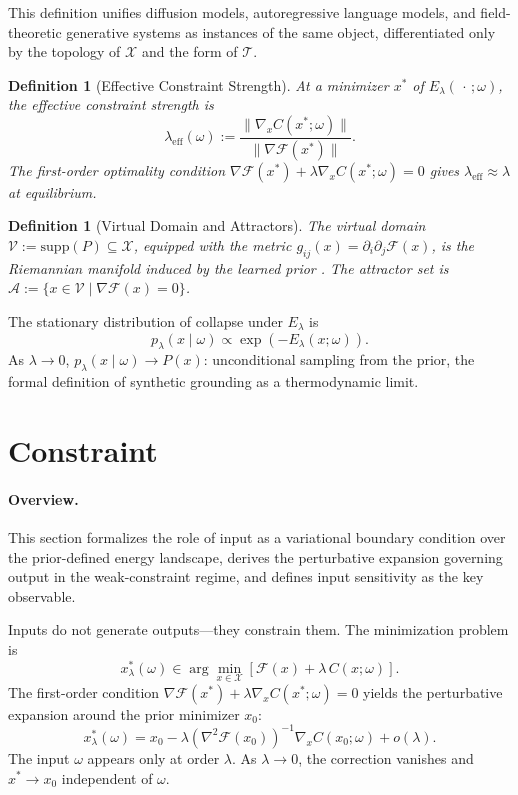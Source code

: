 \documentclass[twocolumn,10pt]{article}
\theoremstyle{thmstyle}
\theoremstyle{defstyle}
\newtheorem{definition}[theorem]{Definition}
\newcommand{\Xspace}{\mathcal{X}}
\newcommand{\Fprior}{\mathcal{F}}
\newcommand{\leff}{\lambda_{\mathrm{eff}}}
\newcommand{\Vdomain}{\mathcal{V}}
\newcommand{\Aset}{\mathcal{A}}
\begin{document}
This definition unifies diffusion models, autoregressive language
models, and field-theoretic generative systems as instances of the same
object, differentiated only by the topology of $\Xspace$ and the form
of $\mathcal{T}$.

\begin{definition}[Effective Constraint Strength]
\label{def:leff}
At a minimizer $x^*$ of $E_\lambda(\,\cdot\,;\omega)$, the
\emph{effective constraint strength} is
\[
  \leff(\omega) :=
  \frac{\|\nabla_x C(x^*;\omega)\|}{\|\nabla\Fprior(x^*)\|}.
\]
The first-order optimality condition $\nabla\Fprior(x^*) + \lambda
\nabla_x C(x^*;\omega) = 0$ gives $\leff \approx \lambda$ at equilibrium.
\end{definition}

\begin{definition}[Virtual Domain and Attractors]
\label{def:vdomain}
The \emph{virtual domain} $\Vdomain := \mathrm{supp}(P) \subseteq
\Xspace$, equipped with the metric $g_{ij}(x) =
\partial_i\partial_j\Fprior(x)$, is the Riemannian manifold induced by
the learned prior \citep{lecun2015deep}. The \emph{attractor set} is
$\Aset := \{x \in \Vdomain \mid \nabla\Fprior(x) = 0\}$.
\end{definition}

The stationary distribution of collapse under $E_\lambda$ is
\begin{equation}
  p_\lambda(x\mid\omega) \propto \exp(-E_\lambda(x;\omega)).
  \label{eq:stationary}
\end{equation}
As $\lambda\to 0$, $p_\lambda(x\mid\omega)\to P(x)$: unconditional
sampling from the prior, the formal definition of synthetic grounding as
a thermodynamic limit.

\section{Constraint}
\label{sec:constraint}

\paragraph{Overview.}
This section formalizes the role of input as a variational boundary
condition over the prior-defined energy landscape, derives the
perturbative expansion governing output in the weak-constraint regime,
and defines input sensitivity as the key observable.

Inputs do not generate outputs---they constrain them. The minimization
problem is
\[
  x^*_\lambda(\omega) \in \arg\min_{x\in\Xspace}
  [\Fprior(x) + \lambda\,C(x;\omega)].
\]
The first-order condition $\nabla\Fprior(x^*) + \lambda\nabla_x
C(x^*;\omega) = 0$ yields the perturbative expansion around the prior
minimizer $x_0$:
\begin{equation}
  x^*_\lambda(\omega) = x_0
  - \lambda(\nabla^2\Fprior(x_0))^{-1}\nabla_x C(x_0;\omega) + o(\lambda).
  \label{eq:perturbative}
\end{equation}
The input $\omega$ appears only at order $\lambda$. As $\lambda\to 0$,
the correction vanishes and $x^*\to x_0$ independent of $\omega$.
\end{document}
